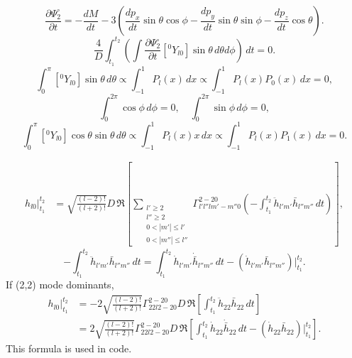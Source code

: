\documentclass{ctexbeamer}
\begin{document}
    \begin{frame}
        \begin{equation*}
            \frac{\partial\Psi_2^\circ}{\partial t}=-\frac{dM}{dt}-3(\frac{dp_x}{dt}\sin\theta\cos\phi-\frac{dp_y}{dt}\sin\theta\sin\phi-\frac{dp_z}{dt}\cos\theta).
        \end{equation*}
        \begin{equation}
            \frac{4}{D}\int_{t_1}^{t_2}\left(\int\frac{\partial\Psi_2^\circ}{\partial t}[{}^0\!Y_{l0}]\sin\theta\,d\theta d\phi\right)\,dt=0.
        \end{equation}
        \begin{equation*}
            \int_0^{\pi}\left[{}^0\!Y_{l0}\right]\sin\theta\,d\theta\propto\int_{-1}^{1}P_l(x)\,dx\propto\int_{-1}^{1}P_l(x)P_0(x)\,dx=0,
        \end{equation*}
        \begin{equation*}
            \int_0^{2\pi}\cos\phi\,d\phi=0,\quad\int_0^{2\pi}\sin\phi\,d\phi=0,
        \end{equation*}
        \begin{equation*}
            \int_0^{\pi}\left[{}^0\!Y_{l0}\right]\cos\theta\sin\theta\,d\theta\propto\int_{-1}^{1}P_l(x)x\,dx\propto\int_{-1}^{1}P_l(x)P_1(x)\,dx=0.
        \end{equation*}
    \end{frame}
    \begin{frame}
        \small
        \begin{align}
            h_{l0}\vert_{t_1}^{t_2}&=\sqrt{\frac{(l-2)!}{(l+2)!}}D\,\Re\left[
            \sum_{\substack{l'\geqslant2\\l''\geqslant2\\0<\left\lvert m'\right\rvert\leqslant l'\\0<\left\lvert m''\right\rvert\leqslant l''}}
            \Gamma^{2-20}_{l'l''lm'-m''0}\left(-\int_{t_1}^{t_2}\ddot{h}_{l'm'}\bar{h}_{l''m''}\,dt\right)
            \right],
        \end{align}
        \begin{equation}
            -\int_{t_1}^{t_2}\ddot{h}_{l'm'}\bar{h}_{l''m''}\,dt=\int_{t_1}^{t_2}\dot{h}_{l'm'}\dot{\bar{h}}_{l''m''}\,dt-(\dot{h}_{l'm'}\bar{h}_{l''m''})\vert_{t_1}^{t_2}.
        \end{equation}
        \normalsize
        If (2,2) mode dominants,
        \small
        \begin{align}
            h_{l0}\vert_{t_1}^{t_2}&=-2\sqrt{\frac{(l-2)!}{(l+2)!}}\Gamma^{2-20}_{22l2-20}D\,\Re\left[
            \int_{t_1}^{t_2}\ddot{h}_{22}\bar{h}_{22}\,dt
            \right]\\
            &=2\sqrt{\frac{(l-2)!}{(l+2)!}}\Gamma^{2-20}_{22l2-20}D\,\Re\left[
            \int_{t_1}^{t_2}\dot{h}_{22}\dot{\bar{h}}_{22}\,dt-(\dot{h}_{22}\bar{h}_{22})\vert_{t_1}^{t_2}
            \right].
        \end{align}
        This formula is used in code.
    \end{frame}
\end{document}
